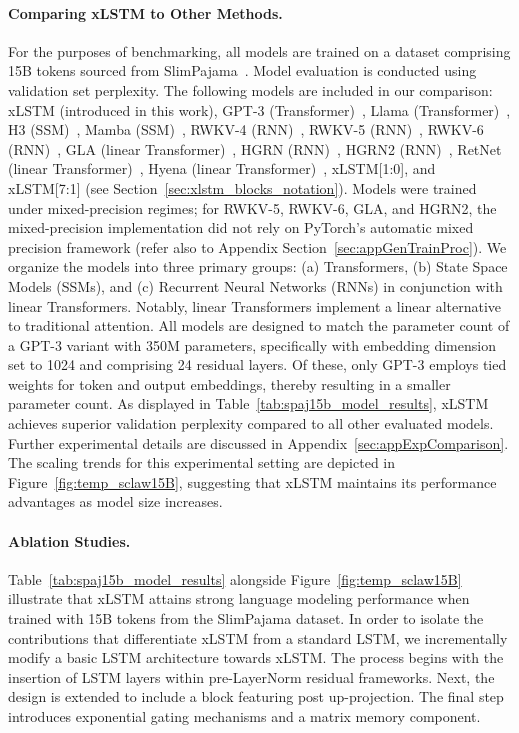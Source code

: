 \paragraph{Comparing xLSTM to Other Methods.} For the purposes of benchmarking, all models are trained on a dataset comprising 15B tokens sourced from SlimPajama~\citep{Soboleva:23}. Model evaluation is conducted using validation set perplexity. The following models are included in our comparison: xLSTM (introduced in this work), GPT-3 (Transformer)~\citep{Brown:20short}, Llama (Transformer)~\citep{Touvron:23arxiv}, H3 (SSM)~\citep{Fu:23}, Mamba (SSM)~\citep{Gu:24arxiv}, RWKV-4 (RNN)~\citep{Peng:23arxivshort}, RWKV-5 (RNN)~\citep{Peng:24arxivshort}, RWKV-6 (RNN)~\citep{Peng:24arxivshort}, GLA (linear Transformer)~\citep{Yang:23arxiv}, HGRN (RNN)~\citep{Qin:23}, HGRN2 (RNN)~\citep{Qin:24arxiv}, RetNet (linear Transformer)~\citep{Sun:23arxiv}, Hyena (linear Transformer)~\citep{Poli:23}, xLSTM[1:0], and xLSTM[7:1] (see Section~\ref{sec:xlstm_blocks_notation}). 
Models were trained under mixed-precision regimes; for RWKV-5, RWKV-6, GLA, and HGRN2, the mixed-precision implementation did not rely on PyTorch’s automatic mixed precision framework (refer also to Appendix Section~\ref{sec:appGenTrainProc}).
We organize the models into three primary groups: (a) Transformers, (b) State Space Models (SSMs), and (c) Recurrent Neural Networks (RNNs) in conjunction with linear Transformers. Notably, linear Transformers implement a linear alternative to traditional attention. All models are designed to match the parameter count of a GPT-3 variant with 350M parameters, specifically with embedding dimension set to 1024 and comprising 24 residual layers. Of these, only GPT-3 employs tied weights for token and output embeddings, thereby resulting in a smaller parameter count. As displayed in Table~\ref{tab:spaj15b_model_results}, xLSTM achieves superior validation perplexity compared to all other evaluated models. Further experimental details are discussed in Appendix~\ref{sec:appExpComparison}. 
The scaling trends for this experimental setting are depicted in Figure~\ref{fig:temp_sclaw15B}, suggesting that xLSTM maintains its performance advantages as model size increases.

\paragraph{Ablation Studies.}
Table~\ref{tab:spaj15b_model_results} alongside Figure~\ref{fig:temp_sclaw15B} illustrate that xLSTM attains strong language modeling performance when trained with 15B tokens from the SlimPajama dataset. In order to isolate the contributions that differentiate xLSTM from a standard LSTM, we incrementally modify a basic LSTM architecture towards xLSTM. The process begins with the insertion of LSTM layers within pre-LayerNorm residual frameworks. Next, the design is extended to include a block featuring post up-projection. The final step introduces exponential gating mechanisms and a matrix memory component.

